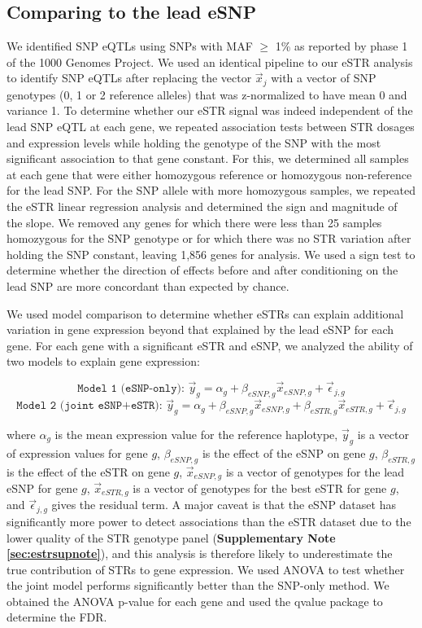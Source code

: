 \subsection{Comparing to the lead eSNP}
We identified SNP eQTLs using SNPs with MAF $\geq$ 1\% as reported by phase 1 of the 1000 Genomes Project. We used an identical pipeline to our eSTR analysis to identify SNP eQTLs after replacing the vector $\vec{x}_j$ with a vector of SNP genotypes (0, 1 or 2 reference alleles) that was z-normalized to have mean 0 and variance 1. To determine whether our eSTR signal was indeed independent of the lead SNP eQTL at each gene, we repeated association tests between STR dosages and expression levels while holding the genotype of the SNP with the most significant association to that gene constant. For this, we determined all samples at each gene that were either homozygous reference or homozygous non-reference for the lead SNP. For the SNP allele with more homozygous samples, we repeated the eSTR linear regression analysis and determined the sign and magnitude of the slope. We removed any genes for which there were less than 25 samples homozygous for the SNP genotype or for which there was no STR variation after holding the SNP constant, leaving 1,856 genes for analysis. We used a sign test to determine whether the direction of effects before and after conditioning on the lead SNP are more concordant than expected by chance.

We used model comparison to determine whether eSTRs can explain additional variation in gene expression beyond that explained by the lead eSNP for each gene. For each gene with a significant eSTR and eSNP, we analyzed the ability of two models to explain gene expression:

\begin{equation}
\texttt{Model 1 (eSNP-only): } \vec{y}_g = \alpha_g + \beta_{eSNP,g}\vec{x}_{eSNP,g} + \vec{\epsilon}_{j,g}
\end{equation}
\begin{equation}
\texttt{Model 2 (joint eSNP+eSTR): } \vec{y}_g = \alpha_g + \beta_{eSNP,g}\vec{x}_{eSNP,g} + \beta_{eSTR,g}\vec{x}_{eSTR,g} + \vec{\epsilon}_{j,g}
\end{equation}

where $\alpha_g$ is the mean expression value for the reference haplotype, $\vec{y}_g$ is a vector of expression values for gene $g$, $\beta_{eSNP,g}$ is the effect of the eSNP on gene $g$, $\beta_{eSTR,g}$ is the effect of the eSTR on gene $g$, $\vec{x}_{eSNP,g}$ is a vector of genotypes for the lead eSNP for gene $g$, $\vec{x}_{eSTR,g}$ is a vector of genotypes for the best eSTR for gene $g$, and $\vec{\epsilon}_{j,g}$ gives the residual term. A major caveat is that the eSNP dataset has significantly more power to detect associations than the eSTR dataset due to the lower quality of the STR genotype panel (\textbf{Supplementary Note \ref{sec:estrsupnote}}), and this analysis is therefore likely to underestimate the true contribution of STRs to gene expression. We used ANOVA to test whether the joint model performs significantly better than the SNP-only method. We obtained the ANOVA p-value for each gene and used the qvalue package to determine the FDR. 

